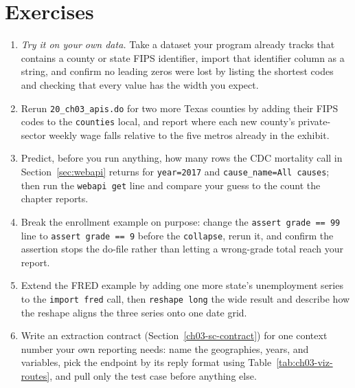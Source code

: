 \section*{Exercises}
\enlargethispage{2\baselineskip}
\begin{enumerate}
  \item \emph{Try it on your own data.} Take a dataset your program already tracks that contains a county or state FIPS identifier, import that identifier column as a string, and confirm no leading zeros were lost by listing the shortest codes and checking that every value has the width you expect.
  \item Rerun \texttt{20\_ch03\_apis.do} for two more Texas counties by adding their FIPS codes to the \texttt{counties} local, and report where each new county's private-sector weekly wage falls relative to the five metros already in the exhibit.
  \item Predict, before you run anything, how many rows the CDC mortality call in Section~\ref{sec:webapi} returns for \texttt{year=2017} and \texttt{cause\_name=All causes}; then run the \texttt{webapi get} line and compare your guess to the count the chapter reports.
  \item Break the enrollment example on purpose: change the \texttt{assert grade == 99} line to \texttt{assert grade == 9} before the \texttt{collapse}, rerun it, and confirm the assertion stops the do-file rather than letting a wrong-grade total reach your report.
  \item Extend the FRED example by adding one more state's unemployment series to the \texttt{import fred} call, then \texttt{reshape long} the wide result and describe how the reshape aligns the three series onto one date grid.
  \item Write an extraction contract (Section~\ref{ch03-sc-contract}) for one context number your own reporting needs: name the geographies, years, and variables, pick the endpoint by its reply format using Table~\ref{tab:ch03-viz-routes}, and pull only the test case before anything else.
\end{enumerate}

